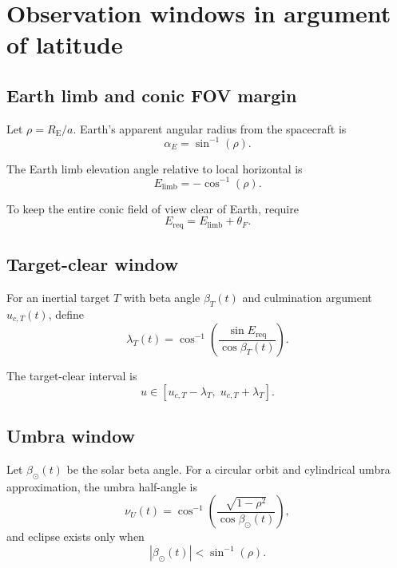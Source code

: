 \documentclass[preprint,12pt]{elsarticle}
\newcommand{\Rearth}{R_{\mathrm{E}}}
\theoremstyle{definition}
\theoremstyle{remark}
\begin{document}
\section{Observation windows in argument of latitude}

\subsection{Earth limb and conic FOV margin}

Let $\rho=\Rearth/a$.
Earth's apparent angular radius from the spacecraft is
\begin{equation}
\alpha_E=\sin^{-1}(\rho).
\end{equation}

The Earth limb elevation angle relative to local horizontal is
\begin{equation}
E_{\mathrm{limb}}=-\cos^{-1}(\rho).
\label{eq:elim}
\end{equation}

To keep the entire conic field of view clear of Earth, require
\begin{equation}
E_{\mathrm{req}}=E_{\mathrm{limb}}+\theta_F.
\label{eq:ereq}
\end{equation}

\subsection{Target-clear window}

For an inertial target $T$ with beta angle $\beta_T(t)$ and culmination argument $u_{c,T}(t)$, define
\begin{equation}
\lambda_T(t)
=
\cos^{-1}\!\left(\frac{\sin E_{\mathrm{req}}}{\cos\beta_T(t)}\right).
\label{eq:lambda_target}
\end{equation}

The target-clear interval is
\begin{equation}
u\in[u_{c,T}-\lambda_T,\;u_{c,T}+\lambda_T].
\end{equation}

\subsection{Umbra window}

Let $\beta_\odot(t)$ be the solar beta angle.
For a circular orbit and cylindrical umbra approximation, the umbra half-angle is
\begin{equation}
\nu_U(t)
=
\cos^{-1}\!\left(
\frac{\sqrt{1-\rho^2}}{\cos\beta_\odot(t)}
\right),
\label{eq:nu_umbra}
\end{equation}
and eclipse exists only when
\begin{equation}
\left|\beta_\odot(t)\right| < \sin^{-1}(\rho).
\label{eq:eclipse_condition}
\end{equation}
\end{document}
